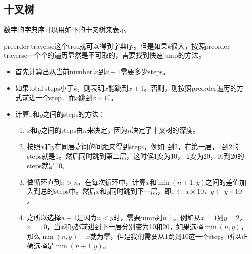 \subsection{十叉树}
数字的字典序可以用如下的十叉树来表示
\begin{figure}[H]
\end{figure}
preorder traverse这个tree就可以得到字典序。但是如果$k$很大，按照preorder traverse一个个的遍历显然是不可取的，需要找到快速jump的方法。
\begin{itemize}
\item 首先计算出从当前number $x$到$x+1$需要多少steps。
\item 如果total steps小于$k$，则表明$x$能跳到$x+1$。否则，则按照preorder遍历的方式前进一个step，而$x$跳到$x\times 10$。
\item 计算$x$和$y$之间的steps的方法： 
\begin{enumerate}
\item $x$和$y$之间的steps由$n$来决定，因为$n$决定了十叉树的深度。
\item 按照$x$和$y$在同层之间的间距来得到steps，例如$1$到$2$，在第一层，1到2的steps就是1。然后同时跳到第二层，这时候1变为10， 2变为20，10到20的steps就是10。
\item 做循环直到$x > n$，在每次循环中，计算$x$和$\min(n+1, y)$之间的差值加入到总的steps中。然后$x$和$y$同时跳到下一层，即$x\gets x\times 10$，$y\gets y\times 10$。
\item 
之所以选择$n+1$是因为$n<y$时，需要jump到$n$上。例如从$x=1$到$y=2$，$n=10$，当$x$和$y$都前进到下一层分别变为10和20，如果选择$\min(n,y)$，那么$\min(n,y)-x$就为零，但是我们需要从1跳到10这一个step。所以正确选择是$\min(n+1,y)$。
\end{enumerate}
\end{itemize}

